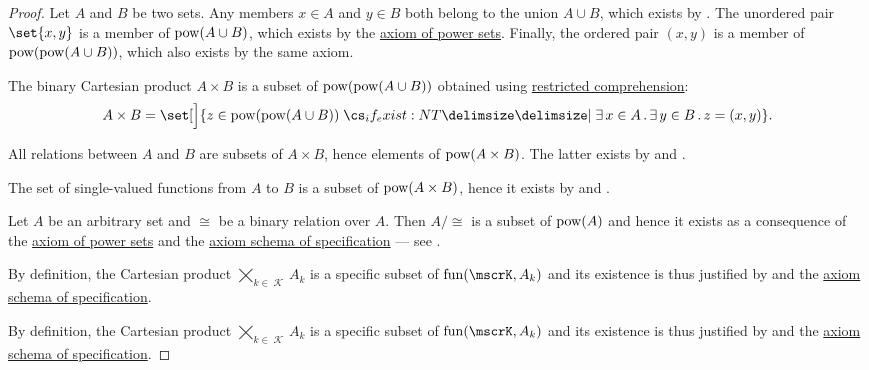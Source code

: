 \begin{proof}
   Let \( A \) and \( B \) be two sets. Any members \( x \in A \) and \( y \in B \) both belong to the union \( A \cup B \), which exists by . The unordered pair \( \set{ x, y } \) is a member of \( \operatorname{pow}(A \cup B) \), which exists by the \hyperref[def:zfc/power_set]{axiom of power sets}. Finally, the ordered pair \( (x, y) \) is a member of \( \operatorname{pow}(\operatorname{pow}(A \cup B)) \), which also exists by the same axiom.

  The binary Cartesian product \( A \times B \) is a subset of \( \operatorname{pow}(\operatorname{pow}(A \cup B)) \) obtained using \hyperref[def:zfc/specification]{restricted comprehension}:
  \begin{equation*}
    A \times B = \set[\Big]{ z \in \pow(\pow(A \cup B)) \given* \qexists {x \in A} \qexists {y \in B} z = (x, y) }.
  \end{equation*}

   All relations between \( A \) and \( B \) are subsets of \( A \times B \), hence elements of \( \operatorname{pow}(A \times B) \). The latter exists by  and .

   The set of single-valued functions from \( A \) to \( B \) is a subset of \( \operatorname{pow}(A \times B) \), hence it exists by  and .

   Let \( A \) be an arbitrary set and \( \cong \) be a binary relation over \( A \). Then \( A / {\cong} \) is a subset of \( \operatorname{pow}(A) \) and hence it exists as a consequence of the \hyperref[def:zfc/power_set]{axiom of power sets} and the \hyperref[def:zfc/specification]{axiom schema of specification} --- see .

   By definition, the Cartesian product \( \bigtimes_{k \in \mscrK} A_k \) is a specific subset of \( \fun(\mscrK, A_k) \) and its existence is thus justified by  and the \hyperref[def:zfc/specification]{axiom schema of specification}.

   By definition, the Cartesian product \( \bigtimes_{k \in \mscrK} A_k \) is a specific subset of \( \fun(\mscrK, A_k) \) and its existence is thus justified by  and the \hyperref[def:zfc/specification]{axiom schema of specification}.


\end{proof}
